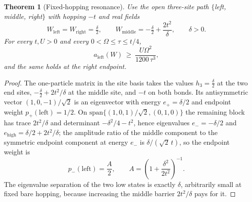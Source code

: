 \documentclass[11pt]{article}
\newtheorem{theorem}{Theorem}[section]
\theoremstyle{definition}
\theoremstyle{remark}
\begin{document}
\begin{theorem}[Fixed-hopping resonance]
\label{thm:witness}
Use the open three-site path $\{$left, middle, right$\}$ with hopping $-t$ and real
fields
\begin{equation}
W_{\mathrm{left}}=W_{\mathrm{right}}=\tfrac{\delta}{2},\qquad
W_{\mathrm{middle}}=-\tfrac{\delta}{2}+\frac{2t^2}{\delta},\qquad \delta>0 .
\label{eq:fields3}
\end{equation}
For every $t,U>0$ and every $0<\Omega\le\tau\le t/4$,
\begin{equation}
a_{\mathrm{left}}(W)\ \ge\ \frac{U\Omega^2}{1200\,\tau^3},
\label{eq:witness}
\end{equation}
and the same holds at the right endpoint.
\end{theorem}

\begin{proof}
The one-particle matrix in the site basis takes the values
$h_3=\tfrac{\delta}{2}$ at the two end sites,
$-\tfrac{\delta}{2}+2t^2/\delta$ at the middle site, and $-t$ on both bonds. Its
antisymmetric vector $(1,0,-1)/\sqrt2$ is an eigenvector with energy $e_+=\delta/2$
and endpoint weight $p_+(\mathrm{left})=1/2$. On
$\mathrm{span}\{(1,0,1)/\sqrt2,(0,1,0)\}$ the remaining block has trace
$2t^2/\delta$ and determinant $-\delta^2/4-t^2$, hence eigenvalues
$e_-=-\delta/2$ and $e_{\mathrm{high}}=\delta/2+2t^2/\delta$; the amplitude ratio of
the middle component to the symmetric endpoint component at energy $e_-$ is
$\delta/(\sqrt2\,t)$, so the endpoint weight is
\begin{equation}
p_-(\mathrm{left})=\frac{A}{2},\qquad
A=\left(1+\frac{\delta^2}{2t^2}\right)^{-1}.
\label{eq:Aweight}
\end{equation}
The eigenvalue separation of the two low states is exactly $\delta$, arbitrarily
small at fixed bare hopping, because increasing the middle barrier $2t^2/\delta$
pays for it.


\end{proof}
\end{document}
